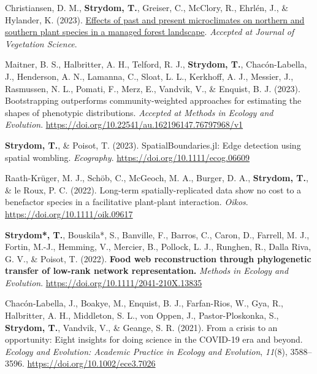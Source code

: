 \documentclass[11pt,a4paper,]{awesome-cv}
\newlength{\cslhangindent}
\newenvironment{CSLReferences}[2] %
 {%
  \setlength{\parindent}{0pt}
  \ifodd #1 \everypar{\setlength{\hangindent}{\cslhangindent}}\ignorespaces\fi
  \ifnum #2 > 0
  \setlength{\parskip}{#2\baselineskip}
  \fi
 }%
 {}
\begin{document}
\hypertarget{refs-journals}{}
\begin{CSLReferences}{1}{0}
\leavevmode{}%
Christiansen, D. M., \textbf{Strydom, T.}, Greiser, C., McClory, R.,
Ehrlén, J., \& Hylander, K. (2023). \href{}{Effects of past and present
microclimates on northern and southern plant species in a managed forest
landscape}. \emph{Accepted at Journal of Vegetation Science}.

\leavevmode{}%
Maitner, B. S., Halbritter, A. H., Telford, R. J., \textbf{Strydom, T.},
Chacón-Labella, J., Henderson, A. N., Lamanna, C., Sloat, L. L.,
Kerkhoff, A. J., Messier, J., Rasmussen, N. L., Pomati, F., Merz, E.,
Vandvik, V., \& Enquist, B. J. (2023). Bootstrapping outperforms
community-weighted approaches for estimating the shapes of phenotypic
distributions. \emph{Accepted at Methods in Ecology and Evolution}.
\url{https://doi.org/10.22541/au.162196147.76797968/v1}

\leavevmode{}%
\textbf{Strydom, T.}, \& Poisot, T. (2023). SpatialBoundaries.jl: Edge
detection using spatial wombling. \emph{Ecography}.
\url{https://doi.org/10.1111/ecog.06609}

\leavevmode{}%
Raath-Krüger, M. J., Schöb, C., McGeoch, M. A., Burger, D. A.,
\textbf{Strydom, T.}, \& le Roux, P. C. (2022). Long-term
spatially-replicated data show no cost to a benefactor species in a
facilitative plant-plant interaction. \emph{Oikos}.
\url{https://doi.org/10.1111/oik.09617}

\leavevmode{}%
\textbf{Strydom*, T.}, Bouskila*, S., Banville, F., Barros, C., Caron,
D., Farrell, M. J., Fortin, M.-J., Hemming, V., Mercier, B., Pollock, L.
J., Runghen, R., Dalla Riva, G. V., \& Poisot, T. (2022). \textbf{Food
web reconstruction through phylogenetic transfer of low-rank network
representation.}\textsuperscript{\clubsuit} \emph{Methods in Ecology and
Evolution}. \url{https://doi.org/10.1111/2041-210X.13835}

\leavevmode{}%
Chacón-Labella, J., Boakye, M., Enquist, B. J., Farfan-Rios, W., Gya,
R., Halbritter, A. H., Middleton, S. L., von Oppen, J.,
Pastor-Ploskonka, S., \textbf{Strydom, T.}, Vandvik, V., \& Geange, S.
R. (2021). From a crisis to an opportunity: {Eight} insights for doing
science in the {COVID}-19 era and beyond. \emph{Ecology and Evolution:
Academic Practice in Ecology and Evolution}, \emph{11}(8), 3588--3596.
\url{https://doi.org/10.1002/ece3.7026}


\end{CSLReferences}
\end{document}
